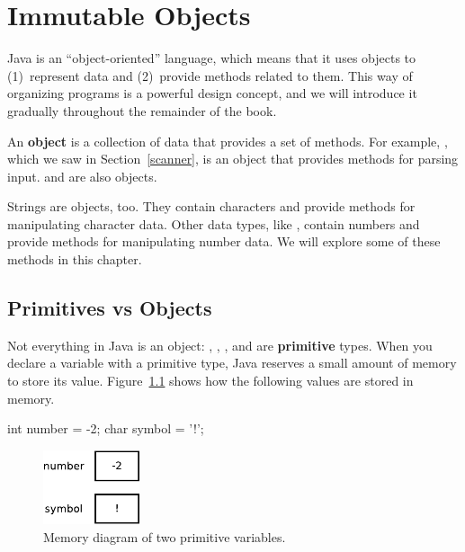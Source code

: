 \chapter{Immutable Objects}
\label{immutable}


Java is an ``object-oriented'' language, which means that it uses objects to (1)~represent data and (2)~provide methods related to them.
This way of organizing programs is a powerful design concept, and we will introduce it gradually throughout the remainder of the book.


An {\bf object} is a collection of data that provides a set of methods.
For example, , which we saw in Section~\ref{scanner}, is an object that provides methods for parsing input.
 and  are also objects.

Strings are objects, too.
They contain characters and provide methods for manipulating character data.
Other data types, like , contain numbers and provide methods for manipulating number data.
We will explore some of these methods in this chapter.


\section{Primitives vs Objects}


Not everything in Java is an object: , , , and  are {\bf primitive} types.
When you declare a variable with a primitive type, Java reserves a small amount of memory to store its value.
Figure~\ref{fig.mem1} shows how the following values are stored in memory.

\begin{code}
int number = -2;
char symbol = '!';
\end{code}

\begin{figure}[!ht]
\begin{center}
\includegraphics[width=80pt]{figs/mem1.pdf}
\caption{Memory diagram of two primitive variables.}
\label{fig.mem1}
\end{center}
\end{figure}

